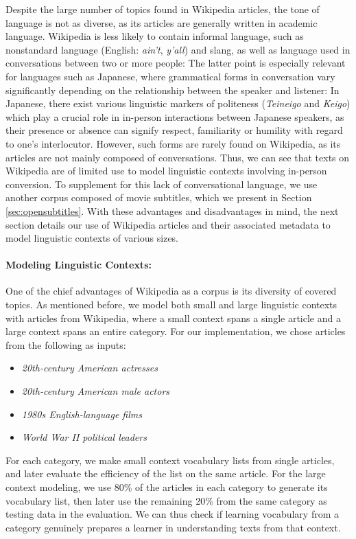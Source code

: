 Despite the large number of topics found in Wikipedia articles, the tone of language is not as diverse, as its articles are generally written in academic language.
Wikipedia is less likely to contain informal language, such as nonstandard language (English: \textit{ain't}, \textit{y'all}) and slang, as well as  language used in conversations between two or more people:
The latter point is especially relevant for languages such as Japanese, where grammatical forms in conversation vary significantly depending on the relationship between the speaker and listener:
In Japanese, there exist various linguistic markers of politeness (\textit{Teineigo} and \textit{Keigo}) which play a crucial role in in-person interactions between Japanese speakers, as their presence or absence can signify respect, familiarity or humility with regard to one's interlocutor.
However, such forms are rarely found on Wikipedia, as its articles are not mainly composed of conversations.
Thus, we can see that texts on Wikipedia are of limited use to model linguistic contexts involving in-person conversion.
To supplement for this lack of conversational language, we use another corpus composed of movie subtitles, which we present in Section \ref{sec:opensubtitles}.
With these advantages and disadvantages in mind, the next section details our use of Wikipedia articles and their associated metadata to model linguistic contexts of various sizes.

\paragraph{Modeling Linguistic Contexts:}
One of the chief advantages of Wikipedia as a corpus is its diversity of covered topics.
As mentioned before, we model both small and large linguistic contexts with articles from Wikipedia, where a small context spans a single article and a large context spans an entire category.
For our implementation, we chose articles from the following as inputs:

\begin{itemize}
	\item \textit{20th-century American actresses}
	\item \textit{20th-century American male actors}
	\item \textit{1980s English-language films}
	\item \textit{World War II political leaders}
\end{itemize}

For each category, we make small context vocabulary lists from single articles, and later evaluate the efficiency of the list on the same article.
For the large context modeling, we use 80\% of the articles in each category to generate its vocabulary list, then later use the remaining 20\% from the same category as testing data in the evaluation.
We can thus check if learning vocabulary from a category genuinely prepares a learner in understanding texts from that context.

